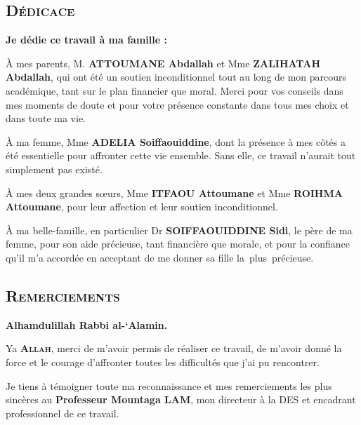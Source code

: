 \documentclass[a4paper,12pt]{report}                %
\begin{document}
    \restoregeometry %
    \begin{center}
        \section*{\textsc{\LARGE Dédicace}}
    \end{center}
    \bigskip
    \textbf{Je dédie ce travail à ma famille :}

    \bigskip

    À mes parents, M. \textbf{ATTOUMANE Abdallah} et Mme \textbf{ZALIHATAH Abdallah}, qui ont été un soutien inconditionnel tout au long de mon parcours académique, 
    tant sur le plan financier que moral. Merci pour vos conseils dans mes moments de doute et pour votre présence constante dans tous mes choix et dans toute ma vie.

    \bigskip

    À ma femme, Mme \textbf{ADELIA Soiffaouiddine}, dont la présence à mes côtés a été essentielle pour affronter cette vie ensemble. 
    Sans elle, ce travail n’aurait tout simplement pas existé.

    \bigskip

    À mes deux grandes sœurs, Mme \textbf{ITFAOU Attoumane} et Mme \textbf{ROIHMA Attoumane}, pour leur affection et leur soutien inconditionnel.

    \bigskip

    À ma belle-famille, en particulier Dr \textbf{SOIFFAOUIDDINE Sidi}, le père de ma femme, pour son aide précieuse, tant financière que morale, 
    et pour la confiance qu’il m’a accordée en acceptant de me donner sa fille la plus précieuse.
    \newpage
    \begin{center}
        \section*{\textsc{\LARGE Remerciements}}
    \end{center}
    \bigskip
    \textbf{\large Alhamdulillah Rabbi al-‘Alamin.}

    \medskip

    Ya \textbf{\textsc{\Large Allah}}, merci de m'avoir permis de réaliser ce travail, de m'avoir donné la force et le courage d'affronter toutes les difficultés que j'ai pu rencontrer.

    Je tiens à témoigner toute ma reconnaissance et mes remerciements les plus sincères au \textbf{\large Professeur Mountaga LAM}, mon directeur à la DES et encadrant professionnel de ce travail.
\end{document}
